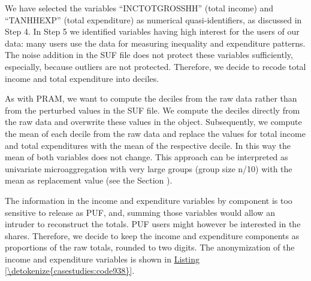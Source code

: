 \documentclass[letterpaper,10pt,english]{sphinxmanual}
\begin{document}

We have selected the variables “INCTOTGROSSHH” (total income) and
“TANHHEXP” (total expenditure) as numerical quasi-identifiers, as
discussed in Step 4. In Step 5 we identified variables having high
interest for the users of our data: many users use the data for
measuring inequality and expenditure patterns. The noise addition in the
SUF file does not protect these variables sufficiently, especially,
because outliers are not protected. Therefore, we decide to recode total
income and total expenditure into deciles.

As with PRAM, we want to compute the deciles from the raw data rather
than from the perturbed values in the SUF file. We compute the deciles
directly from the raw data and overwrite these values in the 
object. Subsequently, we compute the mean of each decile from the raw
data and replace the values for total income and total expenditures with
the mean of the respective decile. In this way the mean of both
variables does not change. This approach can be interpreted as
univariate microaggregation with very large groups (group size n/10)
with the mean as replacement value (see the Section
).

The information in the income and expenditure variables by component is
too sensitive to release as PUF, and, summing those variables would
allow an intruder to reconstruct the totals. PUF users might however be
interested in the shares. Therefore, we decide to keep the income and
expenditure components as proportions of the raw totals, rounded to two
digits. The anonymization of the income and expenditure variables is
shown in \hyperref[\detokenize{casestudies:code938}]{Listing \ref{\detokenize{casestudies:code938}}}.
\end{document}
